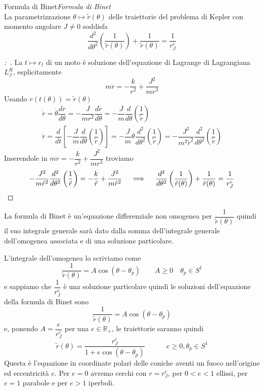 \documentclass[11pt,a4paper,twoside]{book}
\newenvironment{lemma}[1][\empty]{\begin{Lemma}{
\ifx\empty#1\relax\else\mdseries\itshape#1\\\fi
}{}}{\end{Lemma}}
\newenvironment{dimo}[1][\proofname]{
	\begin{tcolorbox}[
	breakable, 
	enhanced, 
	interior hidden, 
	frame hidden, 
	borderline west = {1pt}{0pt}{gray}, 
	top=0pt, bottom=0pt, left=0pt]
\begin{proof}[#1:~]
}
{
\end{proof}
\end{tcolorbox}
}
\theoremstyle{esss}
\theoremstyle{dotless}
\numberwithin{equation}{section} %
\begin{document}
\begin{lemma}[Formula di Binet]
La parametrizzazione $\theta\mapsto\tilde{r}(\theta)$ delle traiettorie del problema di Kepler con momento angolare $J\neq0$ soddisfa
\[
\dfrac{d^2}{d\theta^2}\left(\dfrac{1}{\tilde{r}(\theta)}\right) +\dfrac{1}{\tilde{r}(\theta)}=\dfrac{1}{r_J^c}
\]
\end{lemma}
\begin{dimo}
La $t\mapsto r_t$ di un moto è soluzione dell'equazione di Lagrange di Lagrangiana $L_J^R$, esplicitamente
\[
m\ddot{r}=-\dfrac{k}{r^2}+\dfrac{J^2}{mr^3}
\]
Usando $r(t(\theta))=\tilde{r}(\theta)$ 
\begin{gather*}
\dot{r}=\dot{\theta}\dfrac{dr}{d\theta}=-\dfrac{J}{mr^2}\dfrac{d\tilde{r}}{d\theta}=-\dfrac{J}{m}\dfrac{d}{d\theta}\left(\dfrac{1}{\tilde{r}}\right)
\\
\ddot{r}=\dfrac{d}{dt}\left[ -\dfrac{J}{m}\dfrac{d}{d\theta}\left(\dfrac{1}{\tilde{r}}\right) \right]= -\dfrac{J}{m}\dot{\theta}\dfrac{d^2}{d\theta^2}\left(\dfrac{1}{\tilde{r} }\right)=-\dfrac{J^2}{m^2\tilde{r}^2}\dfrac{d^2}{d\theta^2}\left(\dfrac{1}{\tilde{r}}\right)
\end{gather*}
Inserendole in $m\ddot{r}=-\dfrac{k}{r^2}+\dfrac{J^2}{mr^3}$ troviamo
\[
-\dfrac{J^2}{m\tilde{r}^2}\dfrac{d^2}{d\theta^2}\left(\dfrac{1}{\tilde{r}}\right) = -\dfrac{k}{\tilde{r}}+\dfrac{J^2}{m\tilde{r}^2} \quad \implies \quad
\dfrac{d^2}{d\theta^2}\left(\dfrac{1}{\tilde{r}(\theta)}\right) +\dfrac{1}{\tilde{r}(\theta)}=\dfrac{1}{r_J^c}  \qedhere
\]
\end{dimo}

La formula di Binet è un'equazione differenziale non omogenea per $\dfrac{1}{\tilde{r}(\theta)}$ quindi il suo integrale generale sarà dato dalla somma dell'integrale generale dell'omogenea associata e di una soluzione particolare.

L'integrale dell'omogenea lo scriviamo come \[\dfrac{1}{\tilde{r}(\theta)} =A\cos{(\theta-\theta_p)} \qquad A\geq0\quad\theta_p\in S^1\] e sappiamo che $\dfrac{1}{r_J^c}$ è una soluzione particolare quindi le soluzioni dell'equazione della formula di Binet sono
\[
\dfrac{1}{\tilde{r}(\theta)}=A\cos{(\theta-\theta_p)}
\]
e, ponendo $A=\dfrac{e}{r_J^c}$ per una $e\in\mathbb{R}_+$, le traiettorie saranno quindi
\begin{equation}
\tilde{r}(\theta)=\dfrac{r_J^c}{1+e\cos{(\theta-\theta_p)}} \qquad\quad e\geq 0, \theta_p\in S^1
\end{equation}
Questa è l'equazione in coordinate polari delle coniche aventi un fuoco nell'origine ed eccentricità $e$. Per $e=0$ avremo cerchi con $r=r_J^c$, per $0<e<1$ ellissi, per $e=1$ parabole e per $e>1$ iperboli.
\end{document}
